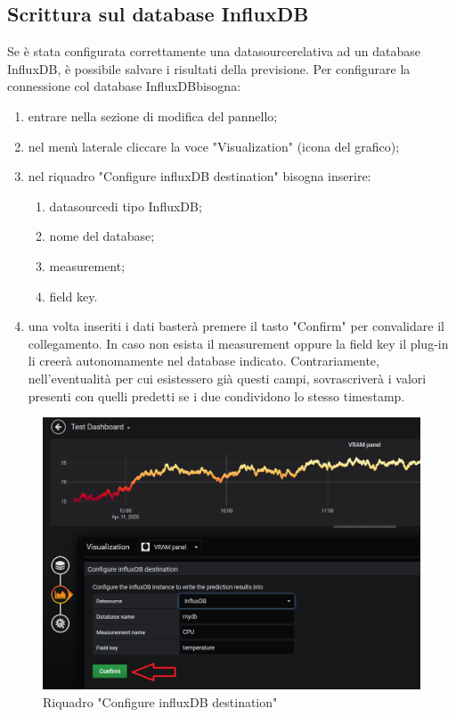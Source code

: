     \subsection{Scrittura sul database InfluxDB}
        Se è stata configurata correttamente una datasource\glosp relativa ad un database InfluxDB\glo, è possibile salvare i risultati della previsione. Per configurare la connessione col database InfluxDB\glosp bisogna:
        \begin{enumerate}
            \item entrare nella sezione di modifica del pannello;
            \item nel menù laterale cliccare la voce "Visualization" (icona del grafico);
            \item nel riquadro "Configure influxDB destination" bisogna inserire:
            \begin{enumerate}
                \item datasource\glosp di tipo InfluxDB\glo;
                \item nome del database;
                \item measurement;
                \item field key.
            \end{enumerate}
            \item una volta inseriti i dati basterà premere il tasto "Confirm" per convalidare il collegamento.
        In caso non esista il measurement oppure la field key il plug-in li creerà autonomamente nel database indicato. Contrariamente, nell'eventualità per cui esistessero già questi campi, sovrascriverà i valori presenti con quelli predetti se i due condividono lo stesso timestamp.
        \end{enumerate}
        \begin{figure}[H]
            \includegraphics[width=\textwidth,height=\textheight,keepaspectratio]{img/scrittura_InfluxDB.png}
            \caption{Riquadro "Configure influxDB destination"}
        \end{figure}
